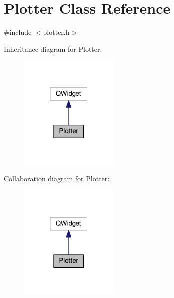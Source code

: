 \hypertarget{class_plotter}{}\section{Plotter Class Reference}
\label{class_plotter}


{\ttfamily \#include $<$plotter.\+h$>$}



Inheritance diagram for Plotter\+:
\nopagebreak
\begin{figure}[H]
\begin{center}
\leavevmode
\includegraphics[width=135pt]{class_plotter__inherit__graph}
\end{center}
\end{figure}


Collaboration diagram for Plotter\+:
\nopagebreak
\begin{figure}[H]
\begin{center}
\leavevmode
\includegraphics[width=135pt]{class_plotter__coll__graph}
\end{center}
\end{figure}
